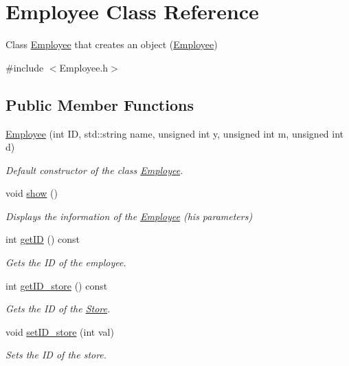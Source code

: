 \hypertarget{class_employee}{}\section{Employee Class Reference}
\label{class_employee}


Class \hyperlink{class_employee}{Employee} that creates an object (\hyperlink{class_employee}{Employee})  




{\ttfamily \#include $<$Employee.\+h$>$}

\subsection*{Public Member Functions}
\begin{DoxyCompactItemize}
\item 
\hyperlink{class_employee_a157c273346ec4911ee412f9e21e0f4a0}{Employee} (int ID, std\+::string name, unsigned int y, unsigned int m, unsigned int d)
\begin{DoxyCompactList}\small\item\em Default constructor of the class \hyperlink{class_employee}{Employee}. \end{DoxyCompactList}\item 
void \hyperlink{class_employee_a86d659298b3c8e66e2529a45ddae211b}{show} ()
\begin{DoxyCompactList}\small\item\em Displays the information of the \hyperlink{class_employee}{Employee} (his parameters) \end{DoxyCompactList}\item 
int \hyperlink{class_employee_abf982538674744cb2f42ad68278d2260}{get\+ID} () const
\begin{DoxyCompactList}\small\item\em Gets the ID of the employee. \end{DoxyCompactList}\item 
int \hyperlink{class_employee_a0a67622c70099242fb6742b860ff4db8}{get\+I\+D\+\_\+store} () const
\begin{DoxyCompactList}\small\item\em Gets the ID of the \hyperlink{class_store}{Store}. \end{DoxyCompactList}\item 
void \hyperlink{class_employee_a4c91952e1fd65e9704fd13efc220f4d3}{set\+I\+D\+\_\+store} (int val)
\begin{DoxyCompactList}\small\item\em Sets the ID of the store. \end{DoxyCompactList}\item 

\end{DoxyCompactItemize}
